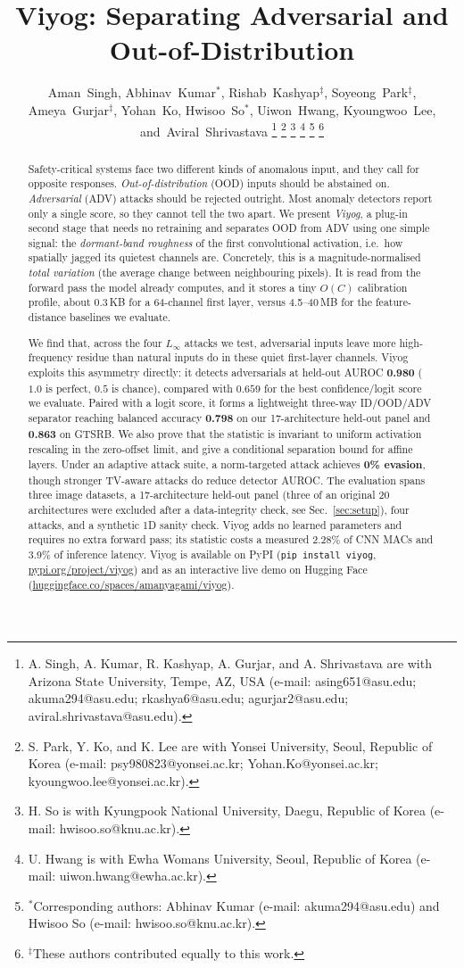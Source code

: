 \documentclass[10pt,letterpaper,journal]{IEEEtran}
\title{ Viyog: Separating Adversarial and Out-of-Distribution }
\author{Aman~Singh, Abhinav~Kumar$^{*}$, Rishab~Kashyap$^{\ddagger}$, Soyeong~Park$^{\ddagger}$, Ameya~Gurjar$^{\ddagger}$, Yohan~Ko, Hwisoo~So$^{*}$, Uiwon~Hwang, Kyoungwoo~Lee, and~Aviral~Shrivastava
\thanks{A. Singh, A. Kumar, R. Kashyap, A. Gurjar, and A. Shrivastava are with Arizona State University, Tempe, AZ, USA (e-mail: asing651@asu.edu; akuma294@asu.edu; rkashya6@asu.edu; agurjar2@asu.edu; aviral.shrivastava@asu.edu).}
\thanks{S. Park, Y. Ko, and K. Lee are with Yonsei University, Seoul, Republic of Korea (e-mail: psy980823@yonsei.ac.kr; Yohan.Ko@yonsei.ac.kr; kyoungwoo.lee@yonsei.ac.kr).}
\thanks{H. So is with Kyungpook National University, Daegu, Republic of Korea (e-mail: hwisoo.so@knu.ac.kr).}
\thanks{U. Hwang is with Ewha Womans University, Seoul, Republic of Korea (e-mail: uiwon.hwang@ewha.ac.kr).}
\thanks{$^{*}$Corresponding authors: Abhinav Kumar (e-mail: akuma294@asu.edu) and Hwisoo So (e-mail: hwisoo.so@knu.ac.kr).}
\thanks{$^{\ddagger}$These authors contributed equally to this work.}
}
\newcommand{\rev}[1]{#1}
\begin{document}
\maketitle

\begin{abstract}
\rev{Safety-critical systems face two different kinds of anomalous input, and
they call for opposite responses. \emph{Out-of-distribution} (OOD) inputs
should be abstained on. \emph{Adversarial} (ADV) attacks should be rejected
outright. Most anomaly detectors report only a single score, so they cannot
tell the two apart. We present \emph{Viyog}, a plug-in second stage that needs
no retraining and separates OOD from ADV using one simple signal: the
\emph{dormant-band roughness} of the first convolutional activation, i.e.\ how
spatially jagged its quietest channels are. Concretely, this is a
magnitude-normalised \emph{total variation} (the average change between
neighbouring pixels). It is read from the forward pass the model already
computes, and it stores a tiny $O(C)$ calibration profile, about 0.3\,KB for a
64-channel first layer, versus 4.5--40\,MB for the feature-distance baselines
we evaluate.

We find that, across the four $L_\infty$ attacks we test, adversarial inputs
leave more high-frequency residue than natural inputs do in these quiet
first-layer channels. Viyog exploits this asymmetry directly: it detects
adversarials at held-out AUROC \textbf{0.980} ($1.0$ is perfect, $0.5$ is
chance), compared with $0.659$ for the best confidence/logit score we
evaluate. Paired with a logit score, it forms a lightweight three-way
ID/OOD/ADV separator reaching balanced accuracy \textbf{0.798} on our
17-architecture held-out panel and \textbf{0.863} on GTSRB. We also prove that
the statistic is invariant to uniform activation rescaling in the
zero-offset limit, and give a conditional separation bound for affine layers.
Under an adaptive attack suite, a norm-targeted attack achieves \textbf{0\%
evasion}, though stronger TV-aware attacks do reduce detector AUROC. The
evaluation spans three image datasets, a 17-architecture held-out panel (three
of an original 20 architectures were excluded after a data-integrity check,
see Sec.~\ref{sec:setup}), four attacks, and a synthetic 1D sanity check.
Viyog adds no learned parameters and requires no extra forward pass; its
statistic costs a measured 2.28\% of CNN MACs and 3.9\% of inference
latency. Viyog is available on PyPI (\texttt{pip install viyog},
\href{https://pypi.org/project/viyog/}{pypi.org/project/viyog}) and as an
interactive live demo on Hugging Face
(\href{https://huggingface.co/spaces/amanyagami/viyog}{huggingface.co/spaces/amanyagami/viyog}).}
\end{abstract}
\end{document}
